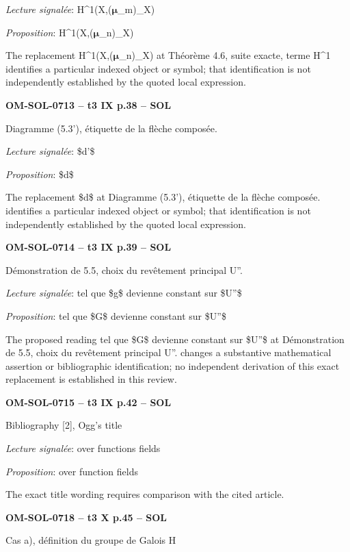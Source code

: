 \emph{Lecture signalée}: H\textasciicircum{}1(X,(\ensuremath{𝛍}\_m)\_X)\par
\emph{Proposition}: H\textasciicircum{}1(X,(\ensuremath{𝛍}\_n)\_X)\par
The replacement H\textasciicircum{}1(X,(\ensuremath{𝛍}\_n)\_X) at Théorème 4.6, suite exacte, terme H\textasciicircum{}1 identifies a particular indexed object or symbol; that identification is not independently established by the quoted local expression.\par
\par\noindent\textbf{OM-SOL-0713 -- t3 IX p.38 -- SOL}\par
Diagramme (5.3'), étiquette de la flèche composée.\par
\emph{Lecture signalée}: \$d'\$\par
\emph{Proposition}: \$d\$\par
The replacement \$d\$ at Diagramme (5.3'), étiquette de la flèche composée. identifies a particular indexed object or symbol; that identification is not independently established by the quoted local expression.\par
\par\noindent\textbf{OM-SOL-0714 -- t3 IX p.39 -- SOL}\par
Démonstration de 5.5, choix du revêtement principal U''.\par
\emph{Lecture signalée}: tel que \$g\$ devienne constant sur \$U''\$\par
\emph{Proposition}: tel que \$G\$ devienne constant sur \$U''\$\par
The proposed reading tel que \$G\$ devienne constant sur \$U''\$ at Démonstration de 5.5, choix du revêtement principal U''. changes a substantive mathematical assertion or bibliographic identification; no independent derivation of this exact replacement is established in this review.\par
\par\noindent\textbf{OM-SOL-0715 -- t3 IX p.42 -- SOL}\par
Bibliography [2], Ogg's title\par
\emph{Lecture signalée}: over functions fields\par
\emph{Proposition}: over function fields\par
The exact title wording requires comparison with the cited article.\par
\par\noindent\textbf{OM-SOL-0718 -- t3 X p.45 -- SOL}\par
Cas a), définition du groupe de Galois H\par
